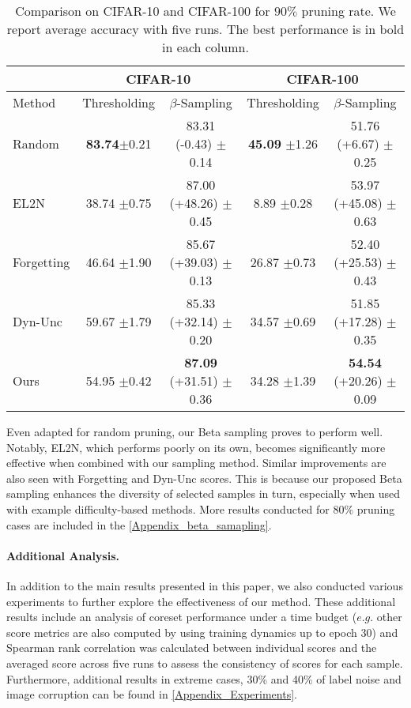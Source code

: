 \begin{table*}[t]
\caption{Comparison on CIFAR-10 and CIFAR-100 for $90\%$ pruning rate. 
We report average accuracy with five runs. The best performance is in bold in each column.}
\label{tab:abl_beta_cifar10_100_90_main}
\setlength{\tabcolsep}{4.5pt}
\centering
\begin{tabular}{lcc|cc}
    \toprule
    \multicolumn{1}{c}{} & \multicolumn{2}{c}{CIFAR-10} & \multicolumn{2}{c}{CIFAR-100} \\
    \midrule
    Method & Thresholding & $\beta$-Sampling & Thresholding & $\beta$-Sampling \\
    \midrule
    Random &  \textbf{83.74}\scriptsize{$\pm$0.21} & 83.31 (-0.43) \scriptsize{$\pm$0.14} & \textbf{45.09} \scriptsize{$\pm$1.26} & 51.76 (+6.67) \scriptsize{$\pm$0.25} \\
    EL2N &  38.74 \scriptsize{$\pm$0.75} & 87.00 (+48.26) \scriptsize{$\pm$0.45} & 8.89 \scriptsize{$\pm$0.28} & 53.97 (+45.08)  \scriptsize{$\pm$0.63}  \\
    Forgetting &  46.64 \scriptsize{$\pm$1.90} & 85.67 (+39.03) \scriptsize{$\pm$0.13} & 26.87 \scriptsize{$\pm$0.73} & 52.40 (+25.53) \scriptsize{$\pm$0.43} \\
    Dyn-Unc &  59.67 \scriptsize{$\pm$1.79} & 85.33 (+32.14) \scriptsize{$\pm$0.20} & 34.57 \scriptsize{$\pm$0.69} & 51.85 (+17.28) \scriptsize{$\pm$0.35}   \\
    \midrule
    Ours & 54.95 \scriptsize{$\pm$0.42} & \textbf{87.09} (+31.51) \scriptsize{$\pm$0.36} & 34.28 \scriptsize{$\pm$1.39} & \textbf{54.54} (+20.26) \scriptsize{$\pm$0.09}  \\
    \bottomrule
\end{tabular}
\end{table*}


Even adapted for random pruning, our Beta sampling proves to perform well. Notably, EL2N, which performs poorly on its own, becomes significantly more effective when combined with our sampling method. Similar improvements are also seen with Forgetting and Dyn-Unc scores. This is because our proposed Beta sampling enhances the diversity of selected samples in turn, especially when used with example difficulty-based methods. More results conducted for 80\% pruning cases are included in the \cref{Appendix_beta_samapling}.
    

\paragraph{Additional Analysis.}
In addition to the main results presented in this paper, we also conducted various experiments to further explore the effectiveness of our method. These additional results include an analysis of coreset performance under a time budget ($e.g.$ other score metrics are also computed by using training dynamics up to epoch 30) and Spearman rank correlation was calculated between individual scores and the averaged score across five runs to assess the consistency of scores for each sample. Furthermore, additional results in extreme cases, 30\% and 40\% of label noise and image corruption can be found in \cref{Appendix_Experiments}.